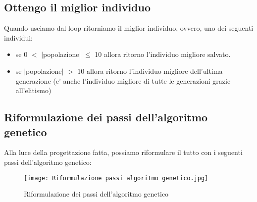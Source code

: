 \documentclass[10pt,a4paper]{article}
\begin{document}
    \subsection{Ottengo il miglior individuo}
    \label{ottengoMigliorIndividuoSubsection}
    Quando usciamo dal loop ritorniamo il miglior individuo, ovvero, uno dei seguenti individui:
    \begin{itemize}
      \item se 0  $<$ $\mid$popolazione$\mid$ $\leq$ 10 allora ritorno l'individuo migliore salvato.
      \item se  $\mid$popolazione$\mid$ $>$ 10 allora ritorno l'individuo migliore dell'ultima generazione 
      (e' anche l'individuo migliore di tutte le generazioni grazie all'elitismo)
    \end{itemize}
    
    \subsection{Riformulazione dei passi dell'algoritmo genetico}
    \label{riformulazioneDeiPassiAlgoritmoGeneticoSubsection}
    Alla luce della progettazione fatta, possiamo riformulare il tutto con i seguenti passi 
    dell'algoritmo genetico: 
    \begin{figure}[h!]
      \centering
      \caption{Riformulazione dei passi dell'algoritmo genetico}
      \texttt{[image: Riformulazione passi algoritmo genetico.jpg]}
      \label{Riformulazione passi algoritmo genetico}
    \end{figure}
     
\end{document}
